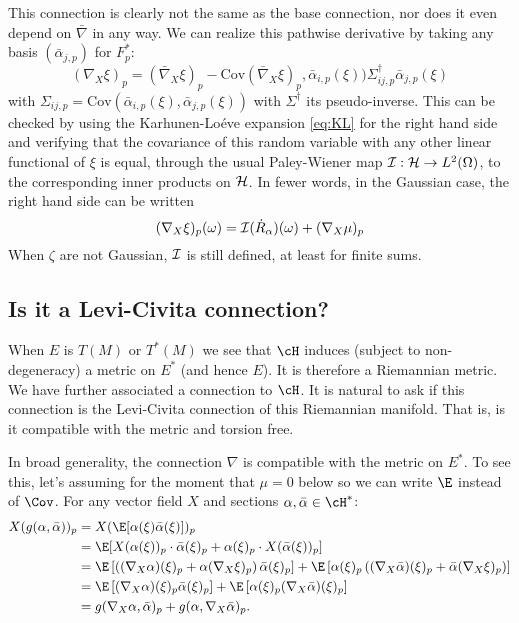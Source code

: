 \documentclass{article}
\begin{document}
This connection is clearly not the same as the base connection, nor
does it even depend on $\bar{\nabla}$ in any way. We can realize this pathwise derivative by
taking any basis $(\bar{\alpha}_{j,p})$ for $F_p^*$:
\begin{equation}
\label{eq:pathwise:1}
(\nabla_X\xi)_p = (\bar{\nabla}_X\xi)_p - \text{Cov}(\bar{\nabla}_X\xi)_p, \bar{\alpha}_{i,p}(\xi))
  \Sigma^{\dagger}_{ij,p} \bar{\alpha}_{j,p}(\xi)
\end{equation}
with $\Sigma_{ij,p} = \text{Cov}(\bar{\alpha}_{i,p}(\xi),
\bar{\alpha}_{j,p}(\xi))$ with $\Sigma^{\dagger}$ its pseudo-inverse.
This can be checked by using the Karhunen-Lo\'eve expansion
\eqref{eq:KL} for the right hand side and verifying that the
covariance of this random variable with any other linear functional of
$\xi$ is equal, through the usual Paley-Wiener map ${\cal I}:{\cal H}
\to L^2(\Omega)$, to the corresponding inner products on ${\cal
  H}$. In fewer words, in the Gaussian case, the right hand side can be written
\begin{equation}
  \label{eq:pathwise:2}
(\nabla_X\xi)_p(\omega) = {\cal I}(\dot{R}_{\alpha})(\omega) + (\nabla_X \mu)_p
\end{equation}
When $\zeta$ are not Gaussian, ${\cal I}$ is still defined, at least for finite sums.

\subsection{Is it a Levi-Civita connection?}

When $E$ is $T(M)$ or $T^*(M)$ we see that $\cH$ induces (subject to non-degeneracy) a metric on
$E^*$ (and hence $E$). It is therefore a Riemannian metric. We have further associated a
connection to $\cH$. It is natural to ask if this connection is the Levi-Civita connection
of this Riemannian manifold. That is, is it compatible with the metric and torsion free.

In broad generality, the connection $\nabla$ is compatible with the metric on $E^*$.
To see this, let's assuming for the moment that $\mu=0$ below so we can write $\E$ instead of $\Cov$.
For any vector field $X$ and sections $\alpha, \bar{\alpha} \in \cH^*$:
$$
\begin{aligned}
  X(g(\alpha, \bar{\alpha}))_p &= X(\E[\alpha(\xi) \bar{\alpha}(\xi)])_p \\
  &= \E[X(\alpha(\xi))_p \cdot \bar{\alpha}(\xi)_p + \alpha(\xi)_p \cdot X(\bar{\alpha}(\xi))_p] \\
&  = \E\left[\left((\nabla_X\alpha)(\xi)_p + \alpha (\nabla_X\xi)_p\right) \bar{\alpha}(\xi)_p\right] + \E\left[\alpha(\xi)_p \left((\nabla_X\bar{\alpha})(\xi)_p + \bar{\alpha} (\nabla_X\xi)_p\right) \right] \\
  &= \E\left[(\nabla_X\alpha)(\xi)_p \bar{\alpha}(\xi)_p\right] + \E\left[\alpha(\xi)_p (\nabla_X\bar{\alpha})(\xi)_p \right] \\
  &= g(\nabla_X\alpha, \bar{\alpha})_p + g(\alpha, \nabla_X\bar{\alpha})_p.
\end{aligned}
$$
\end{document}
